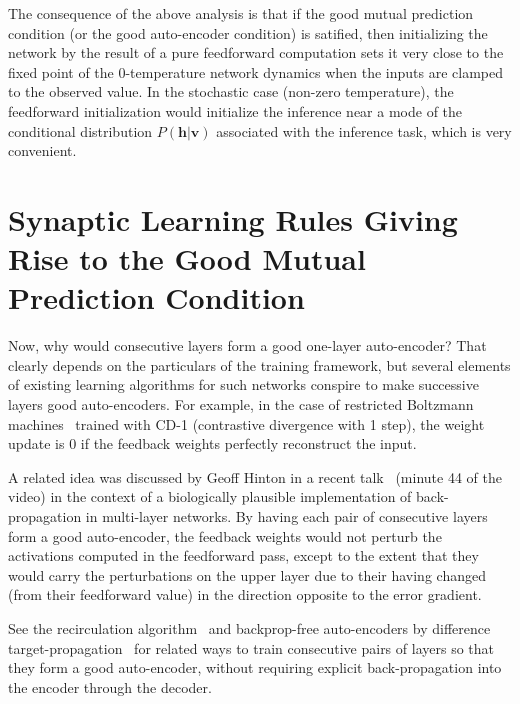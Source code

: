 \documentclass{article}
\newcommand   \vv{{\bm v}}
\newcommand   \vh{{\bm h}}
\begin{document}
The consequence of the above analysis is that if the good mutual prediction condition
(or the good auto-encoder condition) is satified, then initializing the network
by the result of a pure feedforward computation sets it very close to the
fixed point of the 0-temperature network dynamics when the inputs are clamped to the observed value.
In the stochastic case (non-zero temperature), the feedforward initialization would
initialize the inference near a mode of the conditional distribution $P(\vh | \vv)$
associated with the inference task, which is very convenient.

\section{Synaptic Learning Rules Giving Rise to the Good Mutual Prediction Condition}

Now, why would consecutive layers form a good one-layer auto-encoder? 
That clearly depends on the particulars of the training framework, but
several elements of existing learning algorithms for such networks conspire
to make successive layers good auto-encoders. For example, in the case
of restricted Boltzmann machines~\citep{Hinton06} trained with CD-1 (contrastive divergence with 1 step),
the weight update is 0 if the feedback weights perfectly reconstruct the input.

A related idea was discussed by Geoff Hinton in a recent talk~\citep{Hinton-Stanford-talk-27-04-2016}
(minute 44 of the video) in the context of a biologically plausible implementation of back-propagation
in multi-layer networks.
By having each pair of consecutive layers form a good auto-encoder, the feedback weights would not
perturb the activations computed in the feedforward pass, except to the extent that they would carry the perturbations
on the upper layer due to their having changed (from their feedforward value)
in the direction opposite to the error gradient.

See the recirculation algorithm~\citep{Hinton+McClelland-NIPS1987}
and backprop-free auto-encoders by difference target-propagation~\citep{Lee+Bengio-NIPSDL2014-small,Lee-et-al-MLKDB2015-small}
for related ways to train consecutive pairs of layers so that they form a good auto-encoder,
without requiring explicit back-propagation into the encoder through the decoder.
\end{document}
